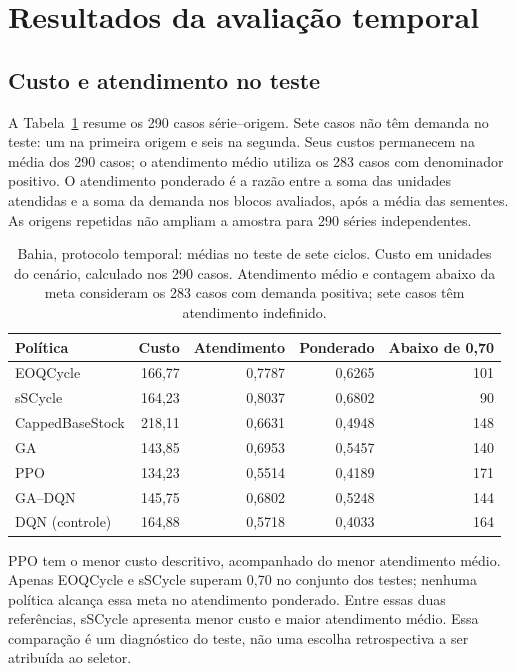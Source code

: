 \section{Resultados da avaliação temporal}
\label{sec:ba2026}

\subsection{Custo e atendimento no teste}

A Tabela~\ref{tab:ba2026_portfolio} resume os 290 casos série--origem. Sete casos não têm demanda no teste: um na primeira origem e seis na segunda. Seus custos permanecem na média dos 290 casos; o atendimento médio utiliza os 283 casos com denominador positivo. O atendimento ponderado é a razão entre a soma das unidades atendidas e a soma da demanda nos blocos avaliados, após a média das sementes. As origens repetidas não ampliam a amostra para 290 séries independentes.

\begin{table}[htbp]
\centering\small
\caption{Bahia, protocolo temporal: médias no teste de sete ciclos. Custo em unidades do cenário, calculado nos 290 casos. Atendimento médio e contagem abaixo da meta consideram os 283 casos com demanda positiva; sete casos têm atendimento indefinido.}
\label{tab:ba2026_portfolio}
\begin{tabular}{@{}lrrrr@{}}\toprule
Política & Custo & Atendimento & Ponderado & Abaixo de 0,70\\\midrule
EOQCycle &166,77&0,7787&0,6265&101\\
sSCycle &164,23&0,8037&0,6802&90\\
CappedBaseStock &218,11&0,6631&0,4948&148\\
GA &143,85&0,6953&0,5457&140\\
PPO &134,23&0,5514&0,4189&171\\
GA--DQN &145,75&0,6802&0,5248&144\\
DQN (controle) &164,88&0,5718&0,4033&164\\
\bottomrule\end{tabular}
\end{table}

PPO tem o menor custo descritivo, acompanhado do menor atendimento médio. Apenas EOQCycle e sSCycle superam 0,70 no conjunto dos testes; nenhuma política alcança essa meta no atendimento ponderado. Entre essas duas referências, sSCycle apresenta menor custo e maior atendimento médio. Essa comparação é um diagnóstico do teste, não uma escolha retrospectiva a ser atribuída ao seletor.

